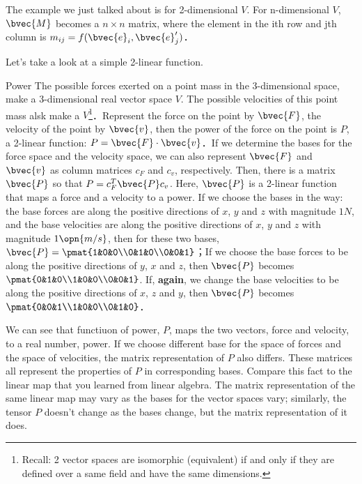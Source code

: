 The example we just talked about is for 2-dimensional $V$. For n-dimensional $V$, $\bvec{M}$ becomes a $n\times n$ matrix, where the element in the ith row and jth column is $m_{ij}=f(\bvec{e}_i, \bvec{e}'_j)$．

Let's take a look at a simple 2-linear function. 

\begin{example}{Power}
The possible forces exerted on a point mass in the 3-dimensional space, make a 3-dimensional real vector space $V$. The possible velocities of this point mass alsk make a $V$\footnote{Recall: 2 vector spaces are isomorphic (equivalent) if and only if they are defined over a same field and have the same dimensions. }．Represent the force on the point by $\bvec{F}$, the velocity of the point by $\bvec{v}$, then the power of the force on the point is $P$, a 2-linear function: $P=\bvec{F}\cdot\bvec{v}$．If we determine the bases for the force space and the velocity space, we can also represent $\bvec{F}$ and $\bvec{v}$ as column matrices $c_F$ and $c_v$, respectively. Then, there is a matrix $\bvec{P}$ so that $P=c^T_F\bvec{P}c_v$. Here, $\bvec{P}$ is a 2-linear function that maps a force and a velocity to a power. If we choose the bases in the way: the base forces are along the positive directions of $x$, $y$ and $z$ with magnitude $1N$, and the base velocities are along the positive directions of $x$, $y$ and $z$ with magnitude $1\opn{m/s}$, then for these two bases, $\bvec{P}=\pmat{1&0&0\\0&1&0\\0&0&1}$；If we choose the base forces to be along the positive directions of $y$, $x$ and $z$, then $\bvec{P}$ becomes $\pmat{0&1&0\\1&0&0\\0&0&1}$. If, \textbf{again}, we change the base velocities to be along the positive directions of $x$, $z$ and $y$, then $\bvec{P}$ becomes $\pmat{0&0&1\\1&0&0\\0&1&0}$．
\end{example}



We can see that functiuon of power, $P$, maps the two vectors, force and velocity, to a real number, power. If we choose different base for the space of forces and the space of velocities, the matrix representation of $P$ also differs. These matrices all represent the properties of $P$ in corresponding bases. Compare this fact to the linear map that you learned from linear algebra. The matrix representation of the same linear map may vary as the bases for the vector spaces vary; similarly, the tensor $P$ doesn't change as the bases change, but the matrix representation of it does. 

